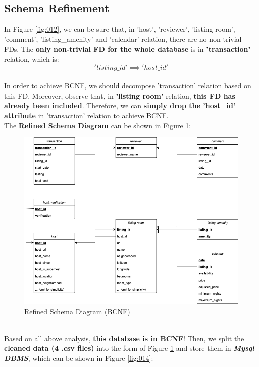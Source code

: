 \documentclass{article}
\begin{document}
	\subsection{Schema Refinement}
	In Figure \ref{fig:012}, we can be sure that, in 'host', 'reviewer', 'listing room', 'comment', 'listing\_amenity' and 'calendar' relation, there are no non-trivial FDs. The \textbf{only non-trivial FD for the whole database} is in \textbf{'transaction'} relation, which is:
	$$
	'listing\_id' \implies 'host\_id'
	$$
	\vspace{3pt}
	\\
	In order to achieve BCNF, we should decompose 'transaction' relation based on this FD. Moreover, observe that, in \textbf{'listing room'} relation, \textbf{this FD has already been included}. Therefore, we can \textbf{simply drop the 'host\_id' attribute} in 'transaction' relation to achieve BCNF.
	\vspace{3pt}
	\\
	The \textbf{Refined Schema Diagram} can be shown in Figure \ref{fig:013}:
	\begin{figure}[h]
		\centering
		\includegraphics[width=.54\textheight]{sd_refine.png}
		\caption{Refined Schema Diagram (BCNF)}
		\label{fig:013}
	\end{figure}
	\\
	Based on all above analysis, \textbf{this database is in BCNF}! Then, we split the \textbf{cleaned data (4 .csv files)} into the form of Figure \ref{fig:013} and store them in \textbf{\textit{Mysql DBMS}}, which can be shown in Figure \ref{fig:014}:
\end{document}
